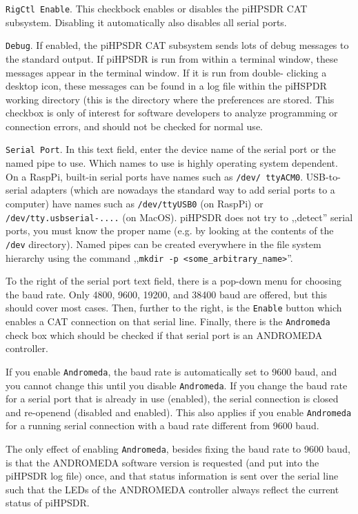 \documentclass[12pt]{book}
\def\rett#1{\texttt{\color{red}#1}}
\begin{document}
\rett{RigCtl Enable}. This checkbock enables or disables the piHPSDR CAT subsystem. Disabling it 
automatically also disables
all serial ports.

\rett{Debug}. If enabled, the piHPSDR CAT subsystem sends lots of debug messages to the standard output. If 
piHPSDR is run
from within a terminal window, these messages appear in the terminal window. If it is run from double-
clicking a desktop icon,
these messages can be found in a log file within the piHSPDR working directory (this is the directory where 
the preferences
are stored. This checkbox is only of interest for software developers to analyze programming or connection 
errors, and should
not be checked for normal use.

\rett{Serial Port}. In this text field, enter the device name of the serial port or the named pipe to use. 
Which names to use 
is highly operating system dependent. On a RaspPi, built-in serial ports have names such as \texttt{/dev/
ttyACM0}. USB-to-serial
adapters (which are nowadays the standard way to add serial ports to a computer) have names such as
\texttt{/dev/ttyUSB0} (on RaspPi) or \texttt{/dev/tty.usbserial-....} (on MacOS). piHPSDR does not try 
to ,,detect'' serial
ports, you must know the proper name (e.g. by looking at the contents of the \texttt{/dev} directory).
Named pipes can be created everywhere in the file system hierarchy using the command
,,\texttt{mkdir -p <some\_arbitrary\_name>}''.

To the right of the serial port text field, there is a pop-down menu for choosing the baud rate. Only 4800, 
9600, 19200, and 38400 baud are offered, but this should cover most cases. Then, further to the right, is 
the \rett{Enable} button which enables a CAT connection on that serial line. Finally, there is the 
\rett{Andromeda} check box which should be checked
if that serial port is an ANDROMEDA controller.

If you enable \rett{Andromeda}, the baud rate is automatically set to 9600 baud, and you cannot
change this until you disable \rett{Andromeda}. If you change the baud rate for a serial
port that is already in use (enabled), the serial connection is closed and re-openend
(disabled and enabled).  This also applies
if you enable \rett{Andromeda} for a running serial connection with a baud rate different
from 9600 baud.

The only effect of enabling \rett{Andromeda}, besides fixing the baud rate to 9600 baud,
is that the ANDROMEDA software version is requested (and put into the piHPSDR log file)
once, and that status information is sent over the serial line such that the LEDs of
the ANDROMEDA controller always reflect the current status of piHPSDR. 
\end{document}
